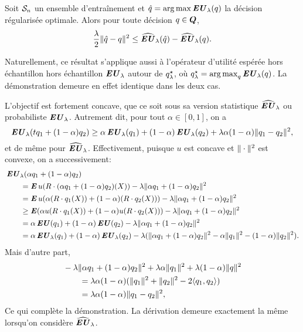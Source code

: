 \begin{lemme}
  \label{lem:conv}
  Soit $\S_n$ un ensemble d'entraînement et $\qh = \argmax\EU_\lambda(q)$ la décision
  régularisée optimale. Alors pour toute décision $q \in \Q$,
  \begin{equation}
    \frac{\lambda}{2}\|\qh - q\|^2 \leq \hEU_\lambda(\qh) - \hEU_\lambda(q).
  \end{equation}
\end{lemme}

\begin{rem}
  Naturellement, ce résultat s'applique aussi à l'opérateur d'utilité espérée hors
  échantillon hors échantillon $\EU_\lambda$ autour de $\qsl$, où
  $\qsl = \argmax_q\EU_\lambda(q)$. La démonstration demeure en effet identique dans les deux
  cas.
\end{rem}



\begin{lemme}
  L'objectif est fortement concave, que ce soit sous sa version statistique $\hEU_\lambda$ ou
  probabiliste $\EU_\lambda$. Autrement dit, pour tout $\alpha \in [0,1]$, on a
  \begin{equation}
    \EU_\lambda(tq_1 + (1-\alpha )q_2) \geq \alpha \EU_\lambda(q_1) + (1-\alpha)\EU_\lambda(q_2) + \lambda \alpha(1-\alpha)\nq{q_1-q_2}^2,
  \end{equation}
  et de même pour $\hEU_\lambda$. Effectivement, puisque $u$ est concave et $\nq{\cdot}^2$ est
  convexe, on a successivement:
  \begin{align}
    & \EU_\lambda(\alpha q_1 + (1-\alpha )q_2)\\
    &\qquad= \E u(R\cdot (\alpha q_1+(1-\alpha )q_2)(X)) - \lambda\nq{\alpha q_1 + (1-\alpha)q_2}^2\\
    &\qquad= \E u(\alpha (R\cdot q_1(X)) + (1-\alpha )(R\cdot q_2(X)))- \lambda\nq{\alpha q_1 + (1-\alpha)q_2}^2\\
    &\qquad\geq \E(\alpha  u(R\cdot q_1(X)) + (1-\alpha )u(R\cdot q_2(X))) - \lambda\nq{\alpha q_1 + (1-\alpha)q_2}^2\\
    &\qquad= \alpha\EU(q_1) + (1-\alpha)\EU(q_2) - \lambda\nq{\alpha q_1 + (1-\alpha)q_2}^2\\
    &\qquad= \alpha\EU_\lambda(q_1) + (1-\alpha)\EU_\lambda(q_2) - \lambda(\nq{\alpha q_1+(1-\alpha)q_2}^2 - \alpha\nq{q_1}^2 -
      (1-\alpha)\nq{q_2}^2).
  \end{align}
  Mais d'autre part,
  \begin{align}
    &-\lambda\nq{\alpha q_1 + (1-\alpha)q_2}^2 + \lambda\alpha\nq{q_1}^2+\lambda(1-\alpha)\nq{q}^2\\
    &\qquad = \lambda\alpha(1-\alpha)(\nq{q_1}^2 + \nq{q_2}^2 - 2\langle q_1,q_2\rangle)\\
    &\qquad = \lambda\alpha(1-\alpha)\nq{q_1-q_2}^2,
  \end{align}
  Ce qui complète la démonstration. La dérivation demeure exactement la même lorsqu'on
  considère $\hEU_\lambda$.
\end{lemme}

